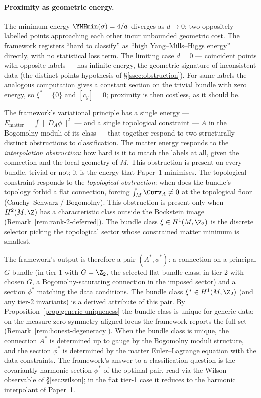 \paragraph{Proximity as geometric energy.} The minimum energy
$\YMHmin(\sigma)=4/d$ diverges as $d\to 0$: two oppositely-labelled
points approaching each other incur unbounded geometric cost. The
framework registers ``hard to classify'' as ``high
Yang--Mills--Higgs energy'' directly, with no statistical loss term.
The limiting case $d=0$ --- coincident points with opposite labels
--- has infinite energy, the geometric signature of inconsistent
data (the distinct-points hypothesis of \S\ref{ssec:obstruction}).
For same labels the analogous computation gives a constant section on
the trivial bundle with zero energy, so $\xi^*=\{0\}$ and $[c_y]=0$;
proximity is then costless, as it should be.

\begin{remark}\label{rem:proximity-quantity}
The framework's variational principle has a single energy ---
$E_{\mathrm{matter}}=\int\|D_A\phi\|^2$ --- and a single topological
constraint --- $A$ in the Bogomolny moduli of its class --- that
together respond to two structurally distinct obstructions to
classification. The matter energy responds to the
\emph{interpolation obstruction}: how hard is it to match the labels
at all, given the connection and the local geometry of $M$. This
obstruction is present on every bundle, trivial or not; it is the
energy that Paper~1 minimises. The topological constraint responds
to the \emph{topological obstruction}: when does the bundle's
topology forbid a flat connection, forcing
$\int_M\Curv_A\neq 0$ at the topological floor (Cauchy--Schwarz /
Bogomolny). This obstruction is present only when $H^2(M,\Z)$ has a
characteristic class outside the Bockstein image
(Remark~\ref{rem:rank-2-deferred}). The bundle class
$\xi\in H^1(M,\Z_2)$ is the discrete selector picking the topological
sector whose constrained matter minimum is smallest.

The framework's output is therefore a pair $(A^*,\phi^*)$: a
connection on a principal $G$-bundle (in tier 1 with $G=\Z_2$, the
selected flat bundle class; in tier 2 with chosen $G$, a
Bogomolny-saturating connection in the imposed sector) and a section
$\phi^*$ matching the data conditions. The bundle class
$\xi^*\in H^1(M,\Z_2)$ (and any tier-2 invariants) is a derived
attribute of this pair. By
Proposition~\ref{prop:generic-uniqueness} the bundle class is
unique for generic data; on the measure-zero symmetry-aligned locus
the framework reports the full set
(Remark~\ref{rem:honest-degeneracy}). When the bundle class is
unique, the connection $A^*$ is determined up to gauge by the
Bogomolny moduli structure, and the section $\phi^*$ is determined
by the matter Euler--Lagrange equation with the data constraints.
The framework's answer to a classification question is the
covariantly harmonic section $\phi^*$ of the optimal pair, read via
the Wilson observable of \S\ref{sec:wilson}; in the flat tier-1
case it reduces to the harmonic interpolant of Paper~1.
\end{remark}

